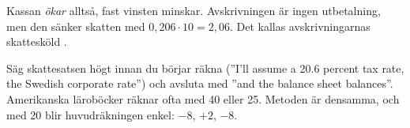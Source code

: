 Kassan \emph{ökar} alltså, fast vinsten minskar. Avskrivningen är ingen utbetalning, men den
sänker skatten med $0,206 \cdot 10 = 2,06$\kr. Det kallas avskrivningarnas skattesköld
.

\begin{intervjutips}
Säg skattesatsen högt innan du börjar räkna (”I'll assume a 20.6 percent tax rate, the Swedish
corporate rate”) och avsluta med ”and the balance sheet balances”. Amerikanska läroböcker räknar
ofta med 40 eller 25\pct. Metoden är densamma, och med 20\pct{} blir huvudräkningen enkel:
$-8$, $+2$, $-8$.
\end{intervjutips}

